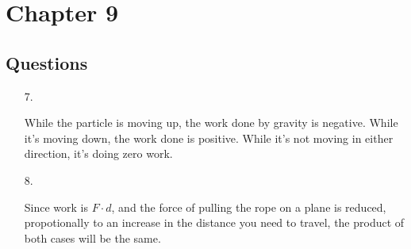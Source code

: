 


\renewcommand\assignment{HW 7, Due Friday, 3/10/2023 23:59; \S9 Q: \#7, 8 P: \#11, 18, 20, 22, 40 \S10 Q: \#4, 8 P: \#11, 15, 22}
\setlength{\belowdisplayskip}{0pt} \setlength{\belowdisplayshortskip}{0pt}
\setlength{\abovedisplayskip}{0pt} \setlength{\abovedisplayshortskip}{0pt}



    \iffalse
    \begin{equation*}
        \begin{gathered}
            Equations go here.
        \end{gathered}
    \end{equation*}

    \resizebox{\hsize}{!}{$Long equation goes here$}

    \begin{multicol*}{# of columns}
    \end{multicol*}

    \horizontal

    \fi


    \section*{Chapter 9}

    \subsection*{Questions}

    \begin{itemize}
        \item [7.]
        
            While the particle is moving up, the work done by gravity is negative. While it's moving down, the work done is positive. While it's not moving in either direction, it's doing zero work.

        \item [8.]
        
            Since work is $F \cdot d$, and the force of pulling the rope on a plane is reduced, propotionally to an increase in the distance you need to travel, the product of both cases will be the same.

    \end{itemize}

